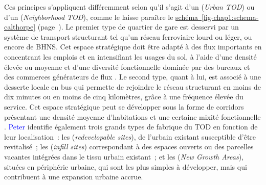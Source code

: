 \begin{refsegment}
Ces principes s'appliquent différemment selon qu'il s'agit d'un  (\textsl{Urban \acrshort{TOD}}) ou d'un  (\textsl{Neighborhood \acrshort{TOD}}), comme le laisse paraître le \hyperref[fig-chap1:schema-calthorpe]{schéma~\ref{fig-chap1:schema-calthorpe}} (page~\pageref{fig-chap1:schema-calthorpe}). Le premier type de quartier de gare est desservi par un système de transport structurant tel qu'un réseau ferroviaire lourd ou léger, ou encore de \acrfull{BHNS}. Cet espace stratégique  doit être adapté à des flux importants en concentrant les emplois et en intensifiant les usages du sol, à l'aide d'une densité élevée ou moyenne et d'une diversité fonctionnelle dominée par des bureaux et des commerces générateurs de flux \textcolor{blue}{\autocite[57]{calthorpe_next_1993}}. Le second type, quant à lui, est associé à une desserte locale en bus qui permette de rejoindre le réseau structurant en moins de dix minutes ou en moins de cinq kilomètres, grâce à une fréquence élevée du service. Cet espace stratégique  peut se développer sous la forme de corridors présentant une densité moyenne d'habitations et une certaine mixité fonctionnelle \textcolor{blue}{\autocite[57]{calthorpe_next_1993}}. \textcolor{blue}{Peter} \textcolor{blue}{\textcite[50, 61]{calthorpe_next_1993}} identifie également trois grands types de fabrique du \acrshort{TOD} en fonction de leur localisation~: les  (\textsl{redevelopable sites}), de l'urbain existant susceptible d'être revitalisé~; les  (\textsl{infill sites}) correspondant à des espaces ouverts ou des parcelles vacantes intégrées dans le tissu urbain existant~; et les  (\textsl{New Growth Areas}), situées en périphérie urbaine, qui sont les plus simples à développer, mais qui contribuent à une expansion urbaine accrue.%


\end{refsegment}
